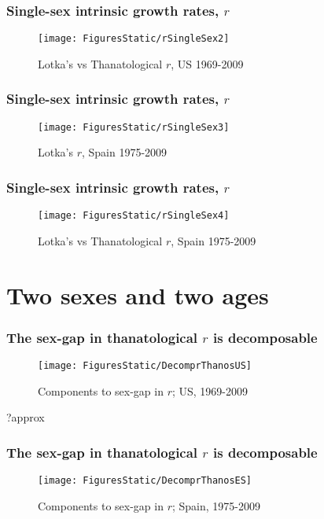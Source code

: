 \documentclass{beamer}
\begin{document}
\begin{frame}
\frametitle{Single-sex intrinsic growth rates, $r$}
\vspace{-2em}
\begin{figure}
      \centering
      \caption*{Lotka's vs Thanatological $r$, US 1969-2009}
      \texttt{[image: FiguresStatic/rSingleSex2]}
\end{figure}
\end{frame}

\begin{frame}
\frametitle{Single-sex intrinsic growth rates, $r$}
\vspace{-2em}
\begin{figure}
      \centering
      \caption*{Lotka's $r$, Spain 1975-2009}
      \texttt{[image: FiguresStatic/rSingleSex3]}
\end{figure}
\end{frame}

\begin{frame}
\frametitle{Single-sex intrinsic growth rates, $r$}
\vspace{-2em}
\begin{figure}
      \centering
      \caption*{Lotka's vs Thanatological $r$, Spain 1975-2009}
      \texttt{[image: FiguresStatic/rSingleSex4]}
\end{figure}
\end{frame}

\section{Two sexes and two ages}


\begin{frame}
  \frametitle{The sex-gap in thanatological $r$ is decomposable}
  \vspace{-2em}
\begin{figure}
\centering
\caption*{Components to sex-gap in $r$; US, 1969-2009}
\texttt{[image: FiguresStatic/DecomprThanosUS]}
\end{figure}
\end{frame}

?approx
\begin{frame}
  \frametitle{The sex-gap in thanatological $r$ is decomposable}
  \vspace{-2em}
\begin{figure}
\centering
\caption*{Components to sex-gap in $r$; Spain, 1975-2009}
\texttt{[image: FiguresStatic/DecomprThanosES]}
\end{figure}
\end{frame}

\end{document}
